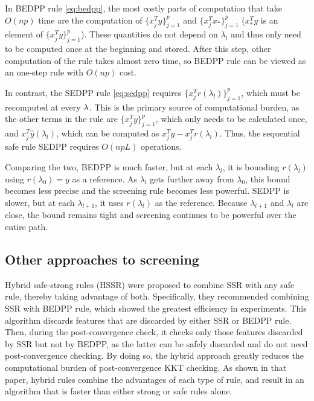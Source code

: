 In BEDPP rule \eqref{eq:bedpp}, the most costly parts of computation that take $O(np)$ time are the computation of $\{x_j^Ty\}_{j=1}^p$ and $\{x_j^Tx_*\}_{j=1}^p$ ($x_*^Ty$ is an element of $\{x_j^Ty\}_{j=1}^p$). These quantities do not depend on $\lambda_l$ and thus only need to be computed once at the beginning and stored. After this step, other computation of the rule takes almost zero time, so BEDPP rule can be viewed as an one-step rule with $O(np)$ cost.

In contrast, the SEDPP rule \eqref{eq:sedpp} requires $\{x_j^Tr(\lambda_l)\}_{j=1}^p$, which must be recomputed at every $\lambda$.  This is the primary source of computational burden, as the other terms in the rule are $\{x_j^Ty\}_{j=1}^p$, which only needs to be calculated once, and $x_j^T\hat{y}(\lambda_l)$, which can be computed as $x_j^Ty-x_j^Tr(\lambda_l)$. Thus, the sequential safe rule SEDPP requires $O(npL)$ operations.

Comparing the two, BEDPP is much faster, but at each $\lambda_l$, it is bounding $r(\lambda_l)$ using $r(\lambda_0)=y$ as a reference. As $\lambda_l$ gets further away from $\lambda_0$, this bound becomes less precise and the screening rule becomes less powerful. SEDPP is slower, but at each $\lambda_{l+1}$, it uses $r(\lambda_{l})$ as the reference. Because $\lambda_{l+1}$ and $\lambda_l$ are close, the bound remains tight and screening continues to be powerful over the entire path.

\subsection{Other approaches to screening}

Hybrid safe-strong rules (HSSR) \citep{Zeng2021} were proposed to combine SSR with any safe rule, thereby taking advantage of both. Specifically, they recommended combining SSR with BEDPP rule, which showed the greatest efficiency in experiments. This algorithm discards features that are discarded by either SSR or BEDPP rule. Then, during the post-convergence check, it checks only those features discarded by SSR but not by BEDPP, as the latter can be safely discarded and do not need post-convergence checking. By doing so, the hybrid approach greatly reduces the computational burden of post-convergence KKT checking.  As shown in that paper, hybrid rules combine the advantages of each type of rule, and result in an algorithm that is faster than either strong or safe rules alone.


